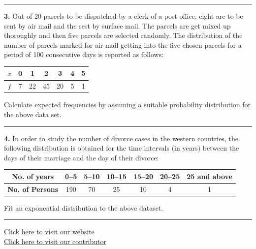 \documentclass[11pt,a4paper]{article}
\begin{document}
\medskip\rule{\linewidth}{0.2pt}\medskip




\noindent   \textbf{3.} Out of 20 parcels to be dispatched by a clerk of a post office, eight are to be sent by air mail and the rest by surface mail. The parcels are get mixed up thoroughly and then five parcels are selected randomly. The distribution of the number of parcels marked for air mail getting into the five chosen parcels for a period of 100 consecutive days is reported as follows:

\begin{center}

\begin{tabular}{|c|c|c|c|c|c|c|}
\hline
$x$ & 0 & 1 & 2 & 3 & 4 & 5 \\
\hline
$f$ & 7 & 22 & 45 & 20 & 5 & 1 \\
\hline
\end{tabular}
\end{center}
Calculate expected frequencies by assuming a suitable probability distribution for the above data set.

\medskip\rule{\linewidth}{0.2pt}\medskip




\noindent   \textbf{4.} In order to study the number of divorce cases in the western countries, the following distribution is obtained for the time intervals (in years) between the days of their marriage and the day of their divorce:

\begin{center}

\begin{tabular}{|c|c|c|c|c|c|c|}
\hline
   \textbf{No. of years} & 0--5 & 5--10 & 10--15 & 15--20 & 20--25 & 25 and above \\
\hline
   \textbf{No. of Persons} & 190 & 70 & 25 & 10 & 4 & 1 \\
\hline
\end{tabular}
\end{center}
Fit an exponential distribution to the above dataset.

\vfill
\rule{\linewidth}{0.4pt}

\begin{center}\small
\href{https://bhu-exam.vercel.app/}{Click here to visit our website}\\[4pt]
\href{https://me-aryan.vercel.app/}{Click here to visit our contributor}
\end{center}
\end{document}

